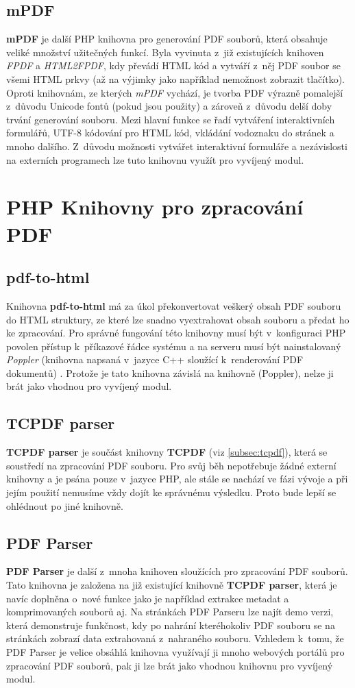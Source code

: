\subsection{mPDF}
\textbf{mPDF} je další PHP knihovna pro generování PDF souborů, která obsahuje veliké množství užitečných funkcí. Byla vyvinuta z~již existujících knihoven \textit{FPDF} a \textit{HTML2FPDF}, kdy převádí HTML kód a vytváří z~něj PDF soubor se všemi HTML prkvy (až na výjimky jako například nemožnost zobrazit tlačítko). Oproti knihovnám, ze kterých \textit{mPDF} vychází, je tvorba PDF výrazně pomalejší z~důvodu Unicode fontů (pokud jsou použity) a zároveň z~důvodu delší doby trvání generování souboru. Mezi hlavní funkce se řadí vytváření interaktivních formulářů, UTF-8 kódování pro HTML kód, vkládání vodoznaku do stránek a mnoho dalšího. Z~důvodu možnosti vytvářet interaktivní formuláře a nezávislosti na externích programech lze tuto knihovnu využít pro vyvíjený modul.
\section{PHP Knihovny pro zpracování PDF}
\subsection{pdf-to-html}
Knihovna \textbf{pdf-to-html} má za úkol překonvertovat veškerý obsah PDF souboru do HTML struktury, ze které lze snadno vyextrahovat obsah souboru a předat ho ke zpracování. Pro správné fungování této knihovny musí být v~konfiguraci PHP povolen přístup k~příkazové řádce systému a na serveru musí být nainstalovaný \textit{Poppler} (knihovna napsaná v~jazyce C++ sloužící k~renderování PDF dokumentů) \cite{pdfToHtml}. Protože je tato knihovna závislá na knihovně (Poppler), nelze ji brát jako vhodnou pro vyvíjený modul. 
\subsection{TCPDF parser}
\textbf{TCPDF parser} je součást knihovny \textbf{TCPDF} (viz \ref{subsec:tcpdf}), která se soustředí na zpracování PDF souboru. Pro svůj běh nepotřebuje žádné externí knihovny a je psána pouze v~jazyce PHP, ale stále se nachází ve fázi vývoje a při jejím použití nemusíme vždy dojít ke správnému výsledku. Proto bude lepší se ohlédnout po jiné knihovně.

\subsection{PDF Parser}
\textbf{PDF Parser} je další z~mnoha knihoven sloužících pro zpracování PDF souborů. Tato knihovna je založena na již existující knihovně \textbf{TCPDF parser}, která je navíc doplněna o~nové funkce jako je například extrakce metadat a komprimovaných souborů aj. Na stránkách PDF Parseru lze najít demo verzi, která demonstruje funkčnost, kdy po nahrání kteréhokoliv PDF souboru se na stránkách zobrazí data extrahovaná z~nahraného souboru. Vzhledem k~tomu, že PDF Parser je velice obsáhlá knihovna využívají ji mnoho webových portálů pro zpracování PDF souborů, pak ji lze brát jako vhodnou knihovnu pro vyvíjený modul.
